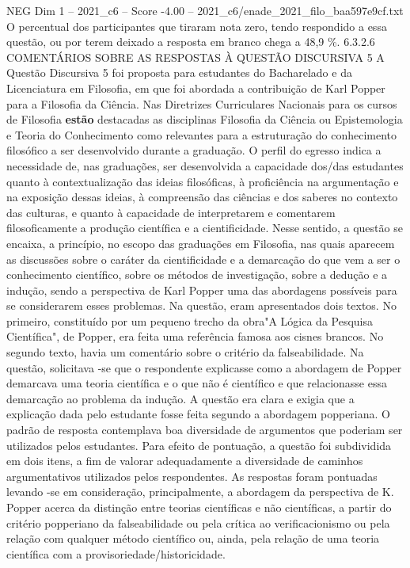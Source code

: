 \begin{textsample}{NEG Dim 1 – 2021\_c6 – Score -4.00 – 2021\_c6/enade\_2021\_filo\_baa597e9cf.txt}
O percentual dos participantes que tiraram nota zero, tendo respondido a essa questão, ou por terem deixado a resposta em branco chega a 48,9 \%. 6.3.2.6 COMENTÁRIOS SOBRE AS RESPOSTAS À QUESTÃO DISCURSIVA 5 A Questão Discursiva 5 foi proposta para estudantes do Bacharelado e da Licenciatura em Filosofia, em que foi abordada a contribuição de Karl Popper para a Filosofia da Ciência.
Nas Diretrizes Curriculares Nacionais para os cursos de Filosofia \textbf{estão} destacadas as disciplinas Filosofia da Ciência ou Epistemologia e Teoria do Conhecimento como relevantes para a estruturação do conhecimento filosófico a ser desenvolvido durante a graduação.
O perfil do egresso indica a necessidade de, nas graduações, ser desenvolvida a capacidade dos/das estudantes quanto à contextualização das ideias filosóficas, à proficiência na argumentação e na exposição dessas ideias, à compreensão das ciências e dos saberes no contexto das culturas, e quanto à capacidade de interpretarem e comentarem filosoficamente a produção científica e a cientificidade.
Nesse sentido, a questão se encaixa, a princípio, no escopo das graduações em Filosofia, nas quais aparecem as discussões sobre o caráter da cientificidade e a demarcação do que vem a ser o conhecimento científico, sobre os métodos de investigação, sobre a dedução e a indução, sendo a perspectiva de Karl Popper uma das abordagens possíveis para se considerarem esses problemas.
Na questão, eram apresentados dois textos.
No primeiro, constituído por um pequeno trecho da obra"A Lógica da Pesquisa Científica", de Popper, era feita uma referência famosa aos cisnes brancos.
No segundo texto, havia um comentário sobre o critério da falseabilidade.
Na questão, solicitava -se que o respondente explicasse como a abordagem de Popper demarcava uma teoria científica e o que não é científico e que relacionasse essa demarcação ao problema da indução.
A questão era clara e exigia que a explicação dada pelo estudante fosse feita segundo a abordagem popperiana.
O padrão de resposta contemplava boa diversidade de argumentos que poderiam ser utilizados pelos estudantes.
Para efeito de pontuação, a questão foi subdividida em dois itens, a fim de valorar adequadamente a diversidade de caminhos argumentativos utilizados pelos respondentes.
As respostas foram pontuadas levando -se em consideração, principalmente, a abordagem da perspectiva de K.
Popper acerca da distinção entre teorias científicas e não científicas, a partir do critério popperiano da falseabilidade ou pela crítica ao verificacionismo ou pela relação com qualquer método científico ou, ainda, pela relação de uma teoria científica com a provisoriedade/historicidade.

\end{textsample}
